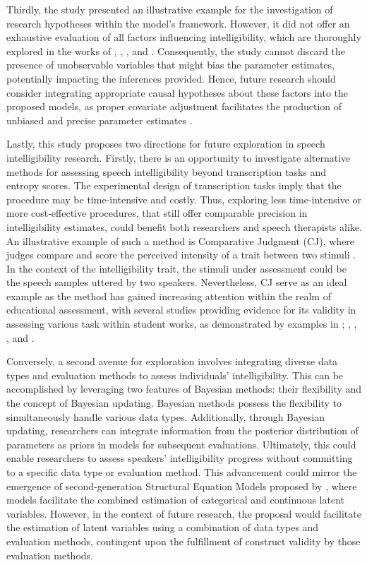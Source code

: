 \documentclass[
  authoryear,
  preprint,
  1p]{elsarticle}
\begin{document}
{Thirdly, the study presented an illustrative example for the
investigation of research hypotheses within the model's framework.}
However, it did not offer an exhaustive evaluation of all factors
influencing intelligibility, which are thoroughly explored in the works
of \citet{Niparko_et_al_2010}, \citet{Boons_et_al_2012},
\citet{Gillis_2018}, and \citet{Fagan_et_al_2020}. Consequently, the
study cannot discard the presence of unobservable variables that might
bias the parameter estimates, potentially impacting the inferences
provided. Hence, future research should consider integrating appropriate
causal hypotheses about these factors into the proposed models, as
proper covariate adjustment facilitates the production of unbiased and
precise parameter estimates
\citep{Cinelli_et_al_2021, Deffner_et_al_2022}.

Lastly, this study proposes two directions for future exploration in
speech intelligibility research. Firstly, there is an opportunity to
investigate alternative methods for assessing speech intelligibility
beyond transcription tasks and entropy scores. The experimental design
of transcription tasks imply that the procedure may be time-intensive
and costly. Thus, exploring less time-intensive or more cost-effective
procedures, that still offer comparable precision in intelligibility
estimates, could benefit both researchers and speech therapists alike.
An illustrative example of such a method is Comparative Judgment (CJ),
where judges compare and score the perceived intensity of a trait
between two stimuli \citep{Thurstone_1927}. In the context of the
intelligibility trait, the stimuli under assessment could be the speech
samples uttered by two speakers. Nevertheless, CJ serve as an ideal
example as the method has gained increasing attention within the realm
of educational assessment, with several studies providing evidence for
its validity in assessing various task within student works, as
demonstrated by examples in \citet{Pollitt_2012a};
\citet{Pollitt_2012b}, \citet{Lesterhuis_2018}, \citet{vanDaal_2020},
and \citet{Verhavert_et_al_2019}.

Conversely, a second avenue for exploration involves integrating diverse
data types and evaluation methods to assess individuals'
intelligibility. This can be accomplished by leveraging two features of
Bayesian methods: their flexibility and the concept of Bayesian
updating. Bayesian methods possess the flexibility to simultaneously
handle various data types. Additionally, through Bayesian updating,
researchers can integrate information from the posterior distribution of
parameters as priors in models for subsequent evaluations. Ultimately,
this could enable researchers to assess speakers' intelligibility
progress without committing to a specific data type or evaluation
method. This advancement could mirror the emergence of second-generation
Structural Equation Models proposed by \citet{Muthen_2001}, where models
facilitate the combined estimation of categorical and continuous latent
variables. However, in the context of future research, the proposal
would facilitate the estimation of latent variables using a combination
of data types and evaluation methods, contingent upon the fulfillment of
construct validity by those evaluation methods.
\end{document}
